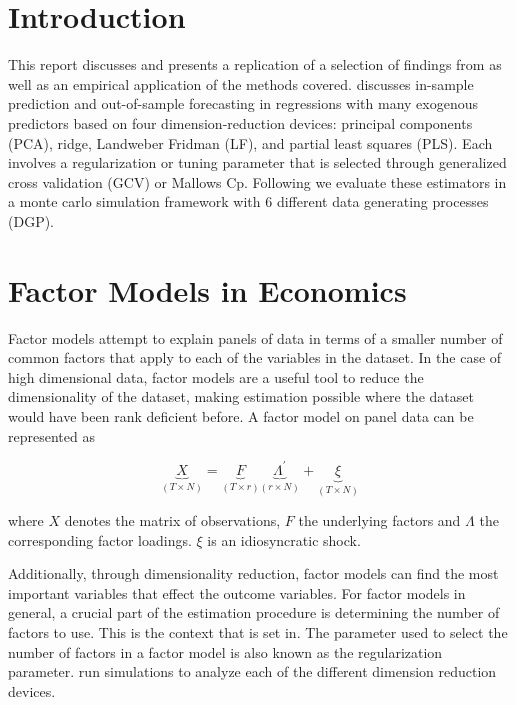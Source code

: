 \renewcommand{\contentsname}{Table of Contents}
\tableofcontents

\newpage

\section{Introduction}
This report discusses and presents a replication of a selection of findings from \cite{carrasco2016sample} as well as an empirical application of the methods covered. \cite{carrasco2016sample} discusses in-sample prediction and out-of-sample forecasting in regressions with many exogenous predictors based on four dimension-reduction devices: principal components (PCA), ridge, Landweber Fridman (LF), and partial least squares (PLS). Each involves a regularization or tuning parameter that is selected through generalized cross validation (GCV) or Mallows Cp. Following \cite{carrasco2016sample} we evaluate these estimators in a monte carlo simulation framework with 6 different data generating processes (DGP). 

\section{Factor Models in Economics}

Factor models attempt to explain panels of data in terms of a smaller number of common factors that apply to each of the variables in the dataset. In the case of high dimensional data, factor models are a useful tool to reduce the dimensionality of the dataset, making estimation possible where the dataset would have been rank deficient before. A factor model on panel data can be represented as

\[\underbrace{X}_{(T \times N)} = \underbrace{F}_{(T \times r)} \underbrace{\Lambda^{'}}_{(r \times N)} + \underbrace{\xi}_{(T \times N)}\]

where $X$ denotes the matrix of observations, $F$ the underlying factors and $\Lambda$ the corresponding factor loadings. $\xi$ is an idiosyncratic shock. 

Additionally, through dimensionality reduction, factor models can find the most important variables that effect the outcome variables.
For factor models in general, a crucial part of the estimation procedure is determining the number of factors to use. This is the context that \cite{carrasco2016sample} is set in. The parameter used to select the number of factors in a factor model is also known as the regularization parameter. \cite{carrasco2016sample} run simulations to analyze each of the different dimension reduction devices. 

